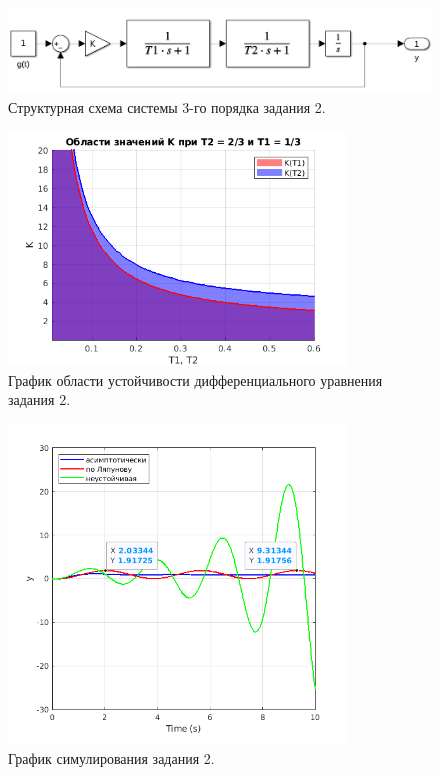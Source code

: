\begin{figure}
    \centering
    \includegraphics[width=1\textwidth]{figs/task_2_slx.png}
    \caption{Структурная схема системы 3-го порядка задания 2.}
    \label{fig:task_2_slx}
\end{figure}

\begin{figure}
    \centering
    \includegraphics[width=0.8\textwidth]{figs/task_2_out.png}
    \caption{График области устойчивости дифференциального уравнения задания 2.}
    \label{fig:task_2_out}
\end{figure}

\begin{figure}
    \centering
    \includegraphics[width=0.8\textwidth]{figs/task_2_out_1.png}
    \caption{График симулирования задания 2.}
    \label{fig:task_2_out_1}
\end{figure}



